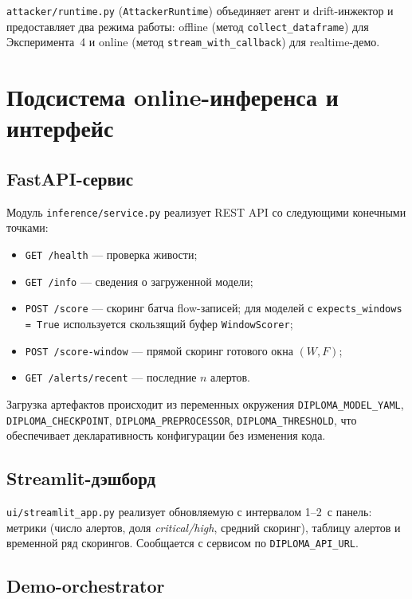 \documentclass[14pt, a4paper]{extarticle}
\begin{document}
\texttt{attacker/runtime.py} (\texttt{AttackerRuntime}) объединяет агент
и drift-инжектор и предоставляет два режима работы: offline (метод
\texttt{collect\_dataframe}) для Эксперимента~4 и online (метод
\texttt{stream\_with\_callback}) для realtime-демо.

\section{Подсистема online-инференса и интерфейс}

\subsection{FastAPI-сервис}

Модуль \texttt{inference/service.py} реализует REST API со следующими
конечными точками:
\begin{itemize}
    \item \texttt{GET /health} --- проверка живости;
    \item \texttt{GET /info} --- сведения о загруженной модели;
    \item \texttt{POST /score} --- скоринг батча flow-записей; для
    моделей с \texttt{expects\_windows = True} используется
    скользящий буфер \texttt{WindowScorer};
    \item \texttt{POST /score-window} --- прямой скоринг готового окна
    \((W, F)\);
    \item \texttt{GET /alerts/recent} --- последние \(n\) алертов.
\end{itemize}

Загрузка артефактов происходит из переменных окружения
\texttt{DIPLOMA\_MODEL\_YAML}, \texttt{DIPLOMA\_CHECKPOINT},
\texttt{DIPLOMA\_PREPROCESSOR}, \texttt{DIPLOMA\_THRESHOLD}, что
обеспечивает декларативность конфигурации без изменения кода.

\subsection{Streamlit-дэшборд}

\texttt{ui/streamlit\_app.py} реализует обновляемую с интервалом
1--2~с панель: метрики (число алертов, доля \emph{critical/high},
средний скоринг), таблицу алертов и временной ряд скорингов. Сообщается с
сервисом по \texttt{DIPLOMA\_API\_URL}.

\subsection{Demo-orchestrator}
\end{document}
